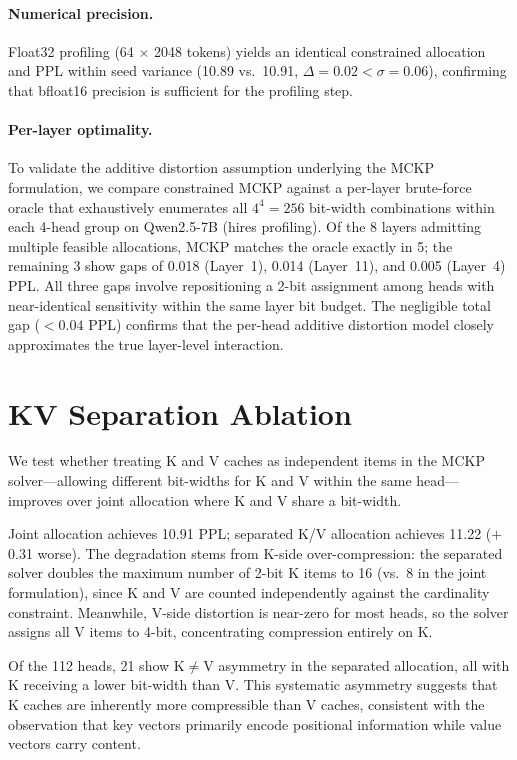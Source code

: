 \paragraph{Numerical precision.}
Float32 profiling (64 $\times$ 2048 tokens) yields an identical constrained allocation and PPL within seed variance (10.89 vs.\ 10.91, $\Delta = 0.02 < \sigma = 0.06$), confirming that bfloat16 precision is sufficient for the profiling step.

\paragraph{Per-layer optimality.}
To validate the additive distortion assumption underlying the MCKP formulation, we compare constrained MCKP against a per-layer brute-force oracle that exhaustively enumerates all $4^4 = 256$ bit-width combinations within each 4-head group on Qwen2.5-7B (hires profiling).
Of the 8 layers admitting multiple feasible allocations, MCKP matches the oracle exactly in 5; the remaining 3 show gaps of 0.018 (Layer~1), 0.014 (Layer~11), and 0.005 (Layer~4) PPL.
All three gaps involve repositioning a 2-bit assignment among heads with near-identical sensitivity within the same layer bit budget.
The negligible total gap ($<0.04$ PPL) confirms that the per-head additive distortion model closely approximates the true layer-level interaction.

\section{KV Separation Ablation}
\label{sec:kv_separation}

We test whether treating K and V caches as independent items in the MCKP solver---allowing different bit-widths for K and V within the same head---improves over joint allocation where K and V share a bit-width.

Joint allocation achieves 10.91 PPL; separated K/V allocation achieves 11.22 ($+$0.31 worse).
The degradation stems from K-side over-compression: the separated solver doubles the maximum number of 2-bit K items to 16 (vs.\ 8 in the joint formulation), since K and V are counted independently against the cardinality constraint.
Meanwhile, V-side distortion is near-zero for most heads, so the solver assigns all V items to 4-bit, concentrating compression entirely on K.

Of the 112 heads, 21 show K$\neq$V asymmetry in the separated allocation, all with K receiving a lower bit-width than V.
This systematic asymmetry suggests that K caches are inherently more compressible than V caches, consistent with the observation that key vectors primarily encode positional information while value vectors carry content.

